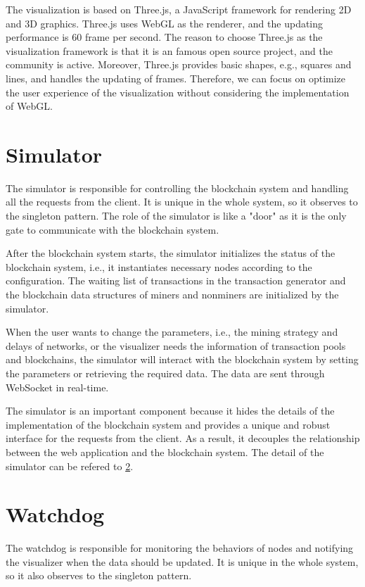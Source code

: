 The visualization is based on Three.js, a JavaScript framework for rendering 2D and 3D graphics. Three.js uses WebGL as the renderer, and the updating performance is 60 frame per second. The reason to choose Three.js as the visualization framework is that it is an famous open source project, and the community is active. Moreover, Three.js provides basic shapes, e.g., squares and lines, and handles the updating of frames. Therefore, we can focus on optimize the user experience of the visualization without considering the implementation of WebGL.

\section{Simulator}

The simulator is responsible for controlling the blockchain system and handling all the requests from the client. It is unique in the whole system, so it observes to the singleton pattern. The role of the simulator is like a "door" as it is the only gate to communicate with the blockchain system.

After the blockchain system starts, the simulator initializes the status of the blockchain system, i.e., it instantiates necessary nodes according to the configuration. The waiting list of transactions in the transaction generator and the blockchain data structures of miners and nonminers are initialized by the simulator. 

When the user wants to change the parameters, i.e., the mining strategy and delays of networks, or the visualizer needs the information of transaction pools and blockchains, the simulator will interact with the blockchain system by setting the parameters or retrieving the required data. The data are sent through WebSocket in real-time.

The simulator is an important component because it hides the details of the implementation of the blockchain system and provides a unique and robust interface for the requests from the client. As a result, it decouples the relationship between the web application and the blockchain system. The detail of the simulator can be refered to \ref{}.

\section{Watchdog}

The watchdog is responsible for monitoring the behaviors of nodes and notifying the visualizer when the data should be updated. It is unique in the whole system, so it also observes to the singleton pattern.

